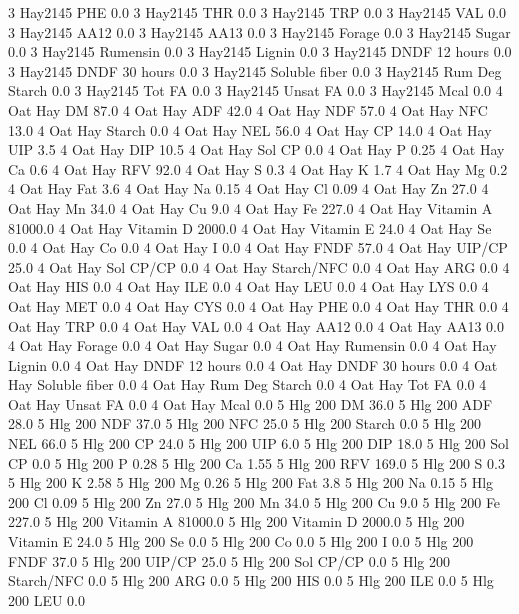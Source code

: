 \documentclass[letterpaper,10pt,english]{sphinxmanual}
\begin{document}
\begin{sphinxVerbatim}[commandchars=\\\{\},numbers=left,firstnumber=1,stepnumber=1]
3 Hay\PYGZsh{}2\PYGZhy{}145 PHE 0.0
3 Hay\PYGZsh{}2\PYGZhy{}145 THR 0.0
3 Hay\PYGZsh{}2\PYGZhy{}145 TRP 0.0
3 Hay\PYGZsh{}2\PYGZhy{}145 VAL 0.0
3 Hay\PYGZsh{}2\PYGZhy{}145 AA\PYGZsh{}12 0.0
3 Hay\PYGZsh{}2\PYGZhy{}145 AA\PYGZsh{}13 0.0
3 Hay\PYGZsh{}2\PYGZhy{}145 \PYGZpc{} Forage 0.0
3 Hay\PYGZsh{}2\PYGZhy{}145 Sugar \PYGZpc{} 0.0
3 Hay\PYGZsh{}2\PYGZhy{}145 Rumensin 0.0
3 Hay\PYGZsh{}2\PYGZhy{}145 Lignin 0.0
3 Hay\PYGZsh{}2\PYGZhy{}145 DNDF 12 hours 0.0
3 Hay\PYGZsh{}2\PYGZhy{}145 DNDF 30 hours 0.0
3 Hay\PYGZsh{}2\PYGZhy{}145 Soluble fiber 0.0
3 Hay\PYGZsh{}2\PYGZhy{}145 Rum Deg Starch 0.0
3 Hay\PYGZsh{}2\PYGZhy{}145 Tot FA 0.0
3 Hay\PYGZsh{}2\PYGZhy{}145 Unsat FA 0.0
3 Hay\PYGZsh{}2\PYGZhy{}145 Mcal 0.0
4 Oat Hay DM 87.0
4 Oat Hay ADF 42.0
4 Oat Hay NDF 57.0
4 Oat Hay NFC 13.0
4 Oat Hay Starch 0.0
4 Oat Hay NEL 56.0
4 Oat Hay CP 14.0
4 Oat Hay UIP 3.5
4 Oat Hay DIP 10.5
4 Oat Hay Sol CP 0.0
4 Oat Hay P 0.25
4 Oat Hay Ca 0.6
4 Oat Hay RFV 92.0
4 Oat Hay S 0.3
4 Oat Hay K 1.7
4 Oat Hay Mg 0.2
4 Oat Hay Fat 3.6
4 Oat Hay Na 0.15
4 Oat Hay Cl 0.09
4 Oat Hay Zn 27.0
4 Oat Hay Mn 34.0
4 Oat Hay Cu 9.0
4 Oat Hay Fe 227.0
4 Oat Hay Vitamin A 81000.0
4 Oat Hay Vitamin D 2000.0
4 Oat Hay Vitamin E 24.0
4 Oat Hay Se 0.0
4 Oat Hay Co 0.0
4 Oat Hay I 0.0
4 Oat Hay FNDF 57.0
4 Oat Hay UIP/CP 25.0
4 Oat Hay Sol CP/CP 0.0
4 Oat Hay Starch/NFC 0.0
4 Oat Hay ARG 0.0
4 Oat Hay HIS 0.0
4 Oat Hay ILE 0.0
4 Oat Hay LEU 0.0
4 Oat Hay LYS 0.0
4 Oat Hay MET 0.0
4 Oat Hay CYS 0.0
4 Oat Hay PHE 0.0
4 Oat Hay THR 0.0
4 Oat Hay TRP 0.0
4 Oat Hay VAL 0.0
4 Oat Hay AA\PYGZsh{}12 0.0
4 Oat Hay AA\PYGZsh{}13 0.0
4 Oat Hay \PYGZpc{} Forage 0.0
4 Oat Hay Sugar \PYGZpc{} 0.0
4 Oat Hay Rumensin 0.0
4 Oat Hay Lignin 0.0
4 Oat Hay DNDF 12 hours 0.0
4 Oat Hay DNDF 30 hours 0.0
4 Oat Hay Soluble fiber 0.0
4 Oat Hay Rum Deg Starch 0.0
4 Oat Hay Tot FA 0.0
4 Oat Hay Unsat FA 0.0
4 Oat Hay Mcal 0.0
5 Hlg 200 DM 36.0
5 Hlg 200 ADF 28.0
5 Hlg 200 NDF 37.0
5 Hlg 200 NFC 25.0
5 Hlg 200 Starch 0.0
5 Hlg 200 NEL 66.0
5 Hlg 200 CP 24.0
5 Hlg 200 UIP 6.0
5 Hlg 200 DIP 18.0
5 Hlg 200 Sol CP 0.0
5 Hlg 200 P 0.28
5 Hlg 200 Ca 1.55
5 Hlg 200 RFV 169.0
5 Hlg 200 S 0.3
5 Hlg 200 K 2.58
5 Hlg 200 Mg 0.26
5 Hlg 200 Fat 3.8
5 Hlg 200 Na 0.15
5 Hlg 200 Cl 0.09
5 Hlg 200 Zn 27.0
5 Hlg 200 Mn 34.0
5 Hlg 200 Cu 9.0
5 Hlg 200 Fe 227.0
5 Hlg 200 Vitamin A 81000.0
5 Hlg 200 Vitamin D 2000.0
5 Hlg 200 Vitamin E 24.0
5 Hlg 200 Se 0.0
5 Hlg 200 Co 0.0
5 Hlg 200 I 0.0
5 Hlg 200 FNDF 37.0
5 Hlg 200 UIP/CP 25.0
5 Hlg 200 Sol CP/CP 0.0
5 Hlg 200 Starch/NFC 0.0
5 Hlg 200 ARG 0.0
5 Hlg 200 HIS 0.0
5 Hlg 200 ILE 0.0
5 Hlg 200 LEU 0.0

\end{sphinxVerbatim}
\end{document}
